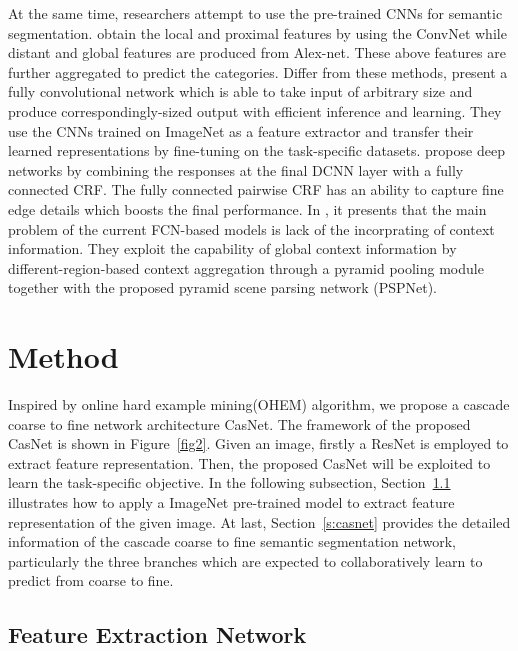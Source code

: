 \documentclass[10.5pt,compsoc]{TsT}
\newcommand{\upcite}[1]{\superscript{\textsuperscript{\cite{#1}}}}
\theoremstyle{mystyle}
\newcommand{\upcite}[1]{\textsuperscript{\cite{#1}}}
\begin{document}
{	At the same time, researchers attempt to use the pre-trained CNNs for semantic segmentation. \cite{17} obtain the local and proximal features by using the ConvNet while distant and global features are produced from Alex-net\upcite{18}. These above features are further aggregated to predict the categories. Differ from these methods, \cite{19} present a fully convolutional network which is able to take input of arbitrary size and produce correspondingly-sized output with efficient inference and learning. They use the CNNs trained on ImageNet as a feature extractor and transfer their learned representations by fine-tuning on the task-specific datasets. \cite{20} propose deep networks by combining the responses at the final DCNN layer with a fully connected CRF. The fully connected pairwise CRF has an ability to capture fine edge details which boosts the final performance. In \cite{21}, it presents that the main problem of the current FCN-based models is lack of the incorprating  of context information. They exploit the capability of global context information by different-region-based context aggregation through a pyramid pooling module together with the proposed pyramid scene parsing network (PSPNet).



\section{Method}
\label{s:Method}
\noindent


Inspired by online hard example mining(OHEM) algorithm, we propose a cascade coarse to fine network architecture CasNet. The framework of the proposed CasNet is shown in Figure~\ref{fig2}. Given an image, firstly a ResNet is employed to extract feature representation. Then, the proposed CasNet will be exploited to learn the task-specific objective. In the following subsection, Section~\ref{s:feature} illustrates how to apply a ImageNet pre-trained model to extract feature representation of the given image. At last, Section~\ref{s:casnet} provides the detailed information of the cascade coarse to fine semantic segmentation network, particularly the three branches which are expected to collaboratively learn to predict from coarse to fine.


\subsection{Feature Extraction Network}
\label{s:feature}
\noindent

}
\end{document}
